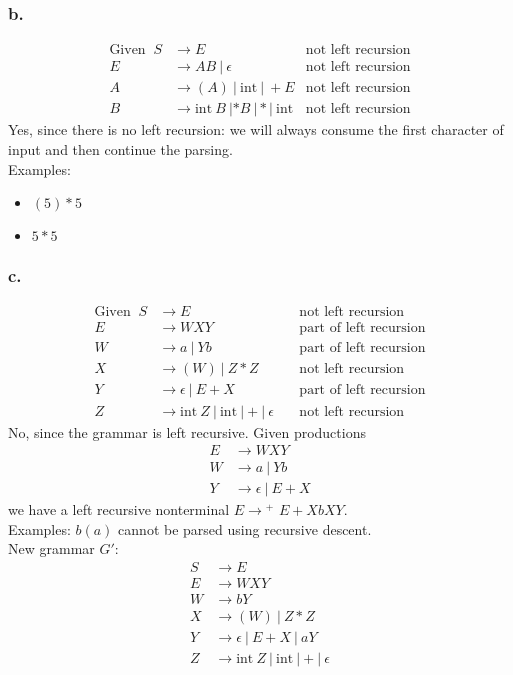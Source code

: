 \documentclass{article}
\begin{document}
	\subsubsection*{b.}
	\begin{align*}
		\text{Given }\  
		S &\rightarrow E &\text{not left recursion} \\
		E &\rightarrow AB~|~\epsilon &\text{not left recursion} \\
		A &\rightarrow ( A )~|~\mathrm{int}~| ~+E &\text{not left recursion} \\
		B &\rightarrow \mathrm{int}~B~| * B~| * |~\mathrm{int} &\text{not left recursion} 
	\end{align*}
	Yes, since there is no left recursion: we will always consume the first character of input and then continue the parsing.\smallskip\\
	Examples:
	\begin{itemize}[topsep=2pt,itemsep=3pt,parsep=0pt,partopsep=0pt]
		\item $(5)*5$
		\item $5*5$
	\end{itemize}
	
	\subsubsection*{c.}
	\begin{align*}
		\text{Given }\  
		S &\rightarrow E &\ &\text{not left recursion} \\
		E &\rightarrow WXY &\ &\text{part of left recursion} \\
		W &\rightarrow a~|~Yb~ &\ &\text{part of left recursion} \\
		X &\rightarrow ( W )~|~Z * Z &\ &\text{not left recursion} \\
		Y &\rightarrow \epsilon~|~E + X &\ &\text{part of left recursion} \\
		Z &\rightarrow \mathrm{int}~Z~|~\mathrm{int}~| + |~\epsilon &\ &\text{not left recursion} 
	\end{align*}
	No, since the grammar is left recursive. Given productions
	\begin{align*}
		E &\rightarrow WXY \\
		W &\rightarrow a~|~Yb~ \\
		Y &\rightarrow \epsilon~|~E + X 
	\end{align*}
	we have a left recursive nonterminal $E \rightarrow${\tiny $^+$} $E+XbXY  $.\smallskip\\
	Examples: $b(a)$ cannot be parsed using recursive descent. \smallskip\\
	New grammar $G'$:
	\begin{align*}
		S &\rightarrow E \\
		E &\rightarrow WXY \\
		W &\rightarrow bY \\
		X &\rightarrow ( W )~|~Z * Z \\
		Y &\rightarrow \epsilon~|~E + X ~|~aY~ \\
		Z &\rightarrow \mathrm{int}~Z~|~\mathrm{int}~| + |~\epsilon \\
	\end{align*}
	
\end{document}
